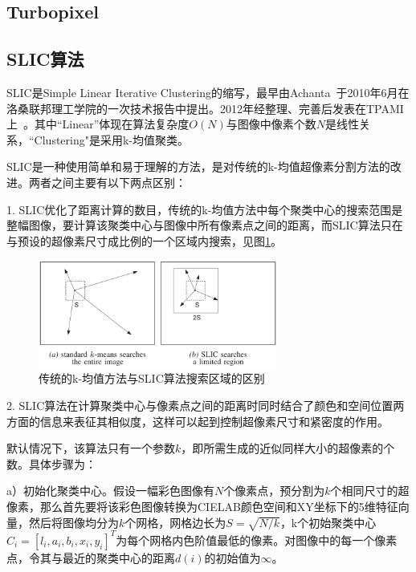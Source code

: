 \documentclass[12pt]{article}
\begin{document}
\subsection{Turbopixel}

\subsection{SLIC算法}

SLIC是Simple Linear Iterative Clustering的缩写，最早由Achanta~\cite{achanta2010slic}于2010年6月在洛桑联邦理工学院的一次技术报告中提出。2012年经整理、完善后发表在TPAMI上~\cite{achanta2012slic}。其中“Linear”体现在算法复杂度$O(N)$与图像中像素个数$N$是线性关系，“Clustering"是采用k-均值聚类。

SLIC是一种使用简单和易于理解的方法，是对传统的k-均值超像素分割方法的改进。两者之间主要有以下两点区别：

1. SLIC优化了距离计算的数目，传统的k-均值方法中每个聚类中心的搜索范围是整幅图像，要计算该聚类中心与图像中所有像素点之间的距离，而SLIC算法只在与预设的超像素尺寸成比例的一个区域内搜索，见图\ref{fig: searchregion}。

\begin{figure}[!ht]
\centering
\includegraphics[width=0.7\textwidth]{searchregion.png}
\caption{传统的k-均值方法与SLIC算法搜索区域的区别}
\label{fig: searchregion}
\end{figure} 

2. SLIC算法在计算聚类中心与像素点之间的距离时同时结合了颜色和空间位置两方面的信息来表征其相似度，这样可以起到控制超像素尺寸和紧密度的作用。

默认情况下，该算法只有一个参数$k$，即所需生成的近似同样大小的超像素的个数。具体步骤为：

a）初始化聚类中心。假设一幅彩色图像有$N$个像素点，预分割为$k$个相同尺寸的超像素，那么首先要将该彩色图像转换为CIELAB颜色空间和XY坐标下的5维特征向量，然后将图像均分为$k$个网格，网格边长为$S=\sqrt{N/k}$，k个初始聚类中心$C_i=[l_i, a_i, b_i, x_i, y_i]^T$为每个网格内色阶值最低的像素。对图像中的每一个像素点，令其与最近的聚类中心的距离$d(i)$的初始值为$\infty$。
\end{document}
